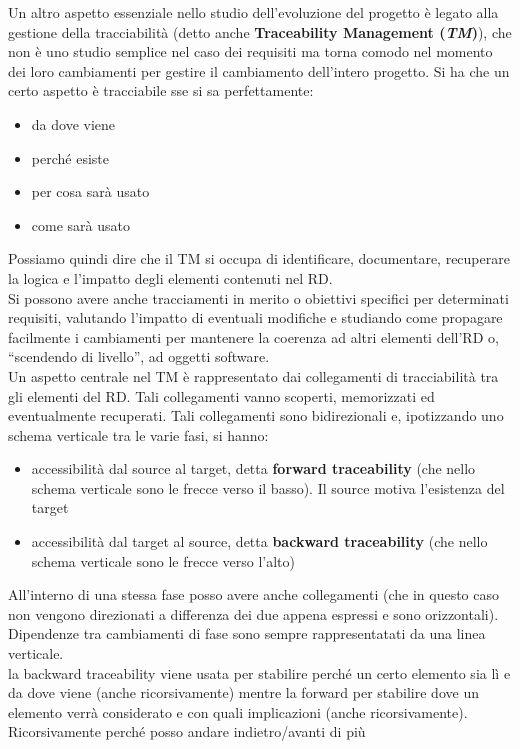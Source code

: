 \documentclass[a4paper,12pt, oneside]{book}
\begin{document}
Un altro aspetto essenziale nello studio dell'evoluzione del progetto è legato
alla gestione della tracciabilità (detto anche \textbf{Traceability Management
  (\textit{TM})}), che non è uno studio semplice nel caso dei requisiti ma torna
comodo nel momento dei loro cambiamenti per gestire il cambiamento dell'intero
progetto. Si ha che un certo aspetto è tracciabile sse si sa perfettamente: 
\begin{itemize}
  \item da dove viene
  \item perché esiste
  \item per cosa sarà usato
  \item come sarà usato
\end{itemize}
Possiamo quindi dire che il TM si occupa di identificare, documentare,
recuperare la logica e l'impatto degli elementi contenuti nel RD. \\
Si possono avere anche tracciamenti in merito o obiettivi specifici per
determinati requisiti, valutando l'impatto di eventuali modifiche e studiando
come propagare facilmente i cambiamenti per mantenere la coerenza ad altri
elementi dell'RD o, ``scendendo di livello'', ad oggetti software.\\
Un aspetto centrale nel TM è rappresentato dai collegamenti di tracciabilità tra
gli elementi del RD. Tali collegamenti vanno scoperti, memorizzati ed
eventualmente recuperati. Tali collegamenti sono bidirezionali e, ipotizzando
uno schema verticale tra le varie fasi, si hanno:
\begin{itemize}
  \item accessibilità dal source al target, detta \textbf{forward traceability}
  (che nello schema verticale sono le frecce verso il basso). Il source motiva
  l'esistenza del target
  \item accessibilità dal target al source, detta \textbf{backward
    traceability} (che nello schema verticale sono le frecce verso l'alto)
\end{itemize}
All'interno di una stessa fase posso avere anche collegamenti (che in questo
caso non vengono direzionati a differenza dei due appena espressi e sono
orizzontali). Dipendenze tra cambiamenti di fase sono sempre rappresentatati da
una linea verticale.\\
la backward traceability viene usata per stabilire perché un certo elemento sia
lì e da dove viene (anche ricorsivamente) mentre la forward per stabilire dove
un elemento verrà considerato e con quali implicazioni (anche
ricorsivamente). Ricorsivamente perché posso andare indietro/avanti di più
\end{document}
